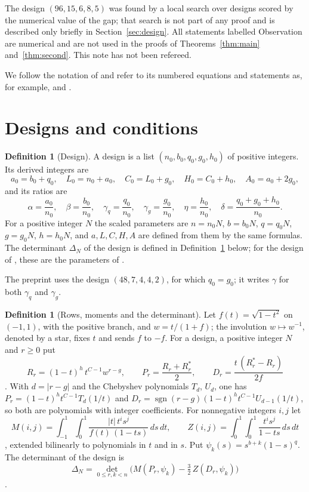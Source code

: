 \documentclass[11pt]{article}
\theoremstyle{definition}
\newtheorem{definition}[theorem]{Definition}
\begin{document}
The design $(96,15,6,8,5)$ was found by a local search over designs scored by the numerical value of the gap; that search is not part of any proof and is described only briefly in Section~\ref{sec:design}. All statements labelled Observation are numerical and are not used in the proofs of Theorems~\ref{thm:main} and~\ref{thm:second}. This note has not been refereed.

We follow the notation of \cite{OAI} and refer to its numbered equations and statements as, for example, \cite[Eq.~(78)]{OAI} and \cite[Prop.~6.1]{OAI}.

\section{Designs and conditions}\label{sec:conditions}

\begin{definition}[Design]\label{def:design}
A design is a list $(n_0,b_0,q_0,g_0,h_0)$ of positive integers. Its derived integers are
\[
a_0=b_0+q_0,\quad L_0=n_0+a_0,\quad C_0=L_0+g_0,\quad H_0=C_0+h_0,\quad A_0=a_0+2g_0,
\]
and its ratios are
\[
\alpha=\frac{a_0}{n_0},\quad\beta=\frac{b_0}{n_0},\quad\gamma_q=\frac{q_0}{n_0},\quad\gamma_g=\frac{g_0}{n_0},\quad\eta=\frac{h_0}{n_0},\quad\delta=\frac{q_0+g_0+h_0}{n_0}.
\]
For a positive integer $N$ the scaled parameters are $n=n_0N$, $b=b_0N$, $q=q_0N$, $g=g_0N$, $h=h_0N$, and $a,L,C,H,A$ are defined from them by the same formulas. The determinant $\Delta_N$ of the design is defined in Definition~\ref{def:det} below; for the design of \cite{OAI}, these are the parameters of \cite[Eq.~(2)]{OAI}.
\end{definition}

The preprint uses the design $(48,7,4,4,2)$, for which $q_0=g_0$; it writes $\gamma$ for both $\gamma_q$ and $\gamma_g$.

\begin{definition}[Rows, moments and the determinant]\label{def:det}
Let $f(t)=\sqrt{1-t^2}$ on $(-1,1)$, with the positive branch, and $w=t/(1+f)$; the involution $w\mapsto w^{-1}$, denoted by a star, fixes $t$ and sends $f$ to $-f$. For a design, a positive integer $N$ and $r\ge0$ put
\[
R_r=(1-t)^h\,t^{C-1}w^{r-g},\qquad P_r=\frac{R_r+R_r^*}2,\qquad D_r=\frac{t\,(R_r^*-R_r)}{2f}
\]
\cite[Eq.~(3)]{OAI}. With $d=|r-g|$ and the Chebyshev polynomials $T_d$, $U_d$, one has $P_r=(1-t)^ht^{C-1}T_d(1/t)$ and $D_r=\operatorname{sgn}(r-g)(1-t)^ht^{C-1}U_{d-1}(1/t)$, so both are polynomials with integer coefficients. For nonnegative integers $i,j$ let
\[
M(i,j)=\int_{-1}^1\!\int_0^1\frac{|t|\,t^is^j}{f(t)\,(1-ts)}\,ds\,dt,\qquad Z(i,j)=\int_0^1\!\int_0^1\frac{t^is^j}{1-ts}\,ds\,dt
\]
\cite[Eq.~(6)]{OAI}, extended bilinearly to polynomials in $t$ and in $s$. Put $\psi_k(s)=s^{b+k}(1-s)^q$. The determinant of the design is
\[
\Delta_N=\det_{0\le r,k<n}\Big(M(P_r,\psi_k)-\tfrac32\,Z(D_r,\psi_k)\Big)
\]
\cite[Eq.~(7)]{OAI}.
\end{definition}
\end{document}

